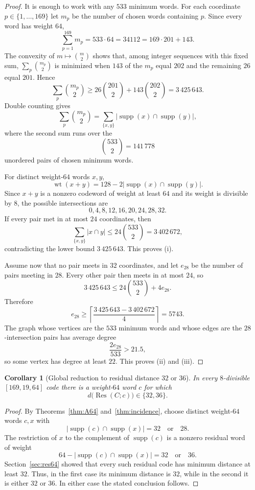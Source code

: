\documentclass[11pt,reqno]{amsart}
\newtheorem{corollary}[theorem]{Corollary}
\theoremstyle{remark}
\newcommand{\supp}{\operatorname{supp}}
\newcommand{\wt}{\operatorname{wt}}
\newcommand{\Res}{\operatorname{Res}}
\begin{document}
\begin{proof}
It is enough to work with any $533$ minimum words.  For each coordinate $p\in\{1,\ldots,169\}$ let $m_p$ be the number of chosen words containing $p$.  Since every word has weight $64$,
\[
\sum_{p=1}^{169}m_p=533\cdot64=34112=169\cdot201+143.
\]
The convexity of $m\mapsto\binom m2$ shows that, among integer sequences with this fixed sum, $\sum_p\binom{m_p}{2}$ is minimized when $143$ of the $m_p$ equal $202$ and the remaining $26$ equal $201$.  Hence
\[
\sum_p\binom{m_p}{2}
\ge 26\binom{201}{2}+143\binom{202}{2}
=3\,425\,643.
\]
Double counting gives
\[
\sum_p\binom{m_p}{2}
=\sum_{\{x,y\}}|\supp(x)\cap\supp(y)|,
\]
where the second sum runs over the
\[
\binom{533}{2}=141\,778
\]
unordered pairs of chosen minimum words.

For distinct weight-$64$ words $x,y$,
\[
\wt(x+y)=128-2|\supp(x)\cap\supp(y)|.
\]
Since $x+y$ is a nonzero codeword of weight at least $64$ and its weight is divisible by $8$, the possible intersections are
\[
0,4,8,12,16,20,24,28,32.
\]
If every pair met in at most $24$ coordinates, then
\[
\sum_{\{x,y\}}|x\cap y|
\le24\binom{533}{2}
=3\,402\,672,
\]
contradicting the lower bound $3\,425\,643$.  This proves (i).

Assume now that no pair meets in $32$ coordinates, and let $e_{28}$ be the number of pairs meeting in $28$.  Every other pair then meets in at most $24$, so
\[
3\,425\,643
\le24\binom{533}{2}+4e_{28}.
\]
Therefore
\[
e_{28}\ge
\left\lceil\frac{3\,425\,643-3\,402\,672}{4}\right\rceil
=5743.
\]
The graph whose vertices are the $533$ minimum words and whose edges are the $28$-intersection pairs has average degree
\[
\frac{2e_{28}}{533}>21.5,
\]
so some vertex has degree at least $22$.  This proves (ii) and (iii).
\end{proof}

\begin{corollary}[Global reduction to residual distance $32$ or $36$]\label{cor:global3236}
In every $8$-divisible $[169,19,64]$ code there is a weight-$64$ word $c$ for which
\[
d\bigl(\Res(C;c)\bigr)\in\{32,36\}.
\]
\end{corollary}

\begin{proof}
By Theorems~\ref{thm:A64} and~\ref{thm:incidence}, choose distinct weight-$64$ words $c,x$ with
\[
|\supp(c)\cap\supp(x)|=32\quad\text{or}\quad28.
\]
The restriction of $x$ to the complement of $\supp(c)$ is a nonzero residual word of weight
\[
64-|\supp(c)\cap\supp(x)|=32\quad\text{or}\quad36.
\]
Section~\ref{sec:res64} showed that every such residual code has minimum distance at least $32$.  Thus, in the first case its minimum distance is $32$, while in the second it is either $32$ or $36$.  In either case the stated conclusion follows.
\end{proof}
\end{document}
